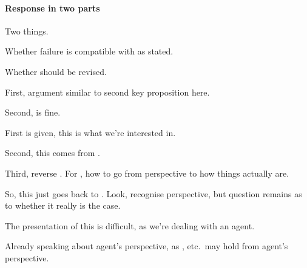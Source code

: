 \paragraph{Response in two parts}

\begin{note}
  Two things.

  Whether failure is compatible with \qzS{} as stated.

  Whether \qzS{} should be revised.
\end{note}

\begin{note}
  First, argument similar to second key proposition here.
\end{note}

\begin{note}
  Second, \qzS{} is fine.
\end{note}

\newpage

\begin{note}
  First is given, this is what we're interested in.

  Second, this comes from \citeauthor{Descartes:1996vp}.

  Third, reverse \citeauthor{Descartes:1996vp}.
  For \citeauthor{Descartes:1996vp}, how to go from perspective to how things actually are.
\end{note}

\begin{note}
  So, this just goes back to \citeauthor{Descartes:1996vp}.
  Look, recognise perspective, but question remains as to whether it really is the case.

  The presentation of this is difficult, as we're dealing with an agent.

  Already speaking about agent's perspective, as , etc.\ may hold from agent's perspective.
\end{note}

